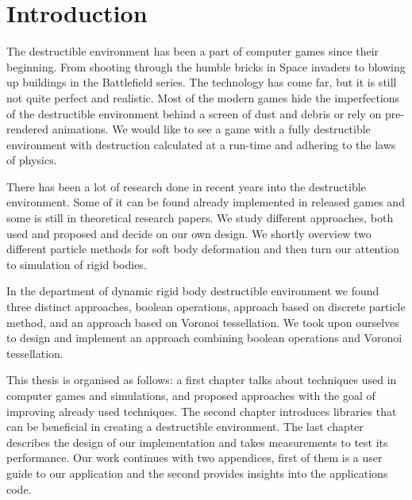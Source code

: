 \chapter*{Introduction}

The destructible environment has been a part of computer games since their beginning. From shooting through the humble bricks in Space invaders to blowing up buildings in the Battlefield series. The technology has come far, but it is still not quite perfect and realistic. Most of the modern games hide the imperfections of the destructible environment behind a screen of dust and debris or rely on pre-rendered animations. We would like to see a game with a fully destructible environment with destruction calculated at a run-time and adhering to the laws of physics.

There has been a lot of research done in recent years into the destructible environment. Some of it can be found already implemented in released games and some is still in theoretical research papers. We study different approaches, both used and proposed and decide on our own design. We shortly overview two different particle methods for soft body deformation and then turn our attention to simulation of rigid bodies. 

In the department of dynamic rigid body destructible environment we found three distinct approaches, boolean operations, approach based on discrete particle method, and an approach based on Voronoi tessellation. We took upon ourselves to design and implement an approach combining boolean operations and Voronoi tessellation.

This thesis is organised as follows: a first chapter talks about techniques used in computer games and simulations, and proposed approaches with the goal of improving already used techniques. The second chapter introduces libraries that can be beneficial in creating a destructible environment. The last chapter describes the design of our implementation and takes measurements to test its performance. Our work continues with two appendices, first of them is a user guide to our application and the second provides insights into the applications code. 

